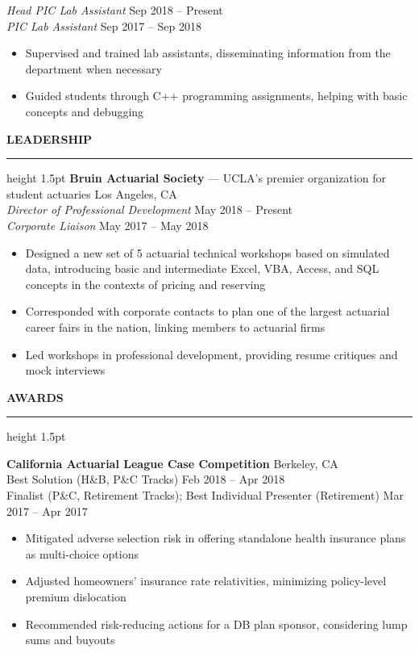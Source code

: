\documentclass[11pt,letterpaper]{article}
\newcommand{\sectline}{\vspace{4pt}\hrule height 1.5pt\vspace{4pt}}
\newcommand{\sectspace}{\vspace{8pt}}
\begin{document}
\textit{Head PIC Lab Assistant} \hfill Sep 2018 -- Present \\
\textit{PIC Lab Assistant} \hfill Sep 2017 -- Sep 2018
\begin{itemize}
	\item Supervised and trained lab assistants, disseminating information from the department when necessary
	\item Guided students through C++ programming assignments, helping with basic concepts and debugging
\end{itemize}
\sectspace


\textbf{LEADERSHIP} \sectline
\textbf{Bruin Actuarial Society} --- UCLA's premier organization for student actuaries \hfill Los Angeles, CA \\
\textit{Director of Professional Development} \hfill May 2018 -- Present \\
\textit{Corporate Liaison} \hfill May 2017 -- May 2018
\begin{itemize}
	\item Designed a new set of 5 actuarial technical workshops based on simulated data, introducing basic and intermediate Excel, VBA, Access, and SQL concepts in the contexts of pricing and reserving
	\item Corresponded with corporate contacts to plan one of the largest actuarial career fairs in the nation, linking members to actuarial firms
	\item Led workshops in professional development, providing resume critiques and mock interviews
\end{itemize}
\sectspace

\textbf{AWARDS} \sectline

\textbf{California Actuarial League Case Competition} \hfill Berkeley, CA \\
Best Solution (H\&B, P\&C Tracks) \hfill Feb 2018 -- Apr 2018 \\
Finalist (P\&C, Retirement Tracks); Best Individual Presenter (Retirement) \hfill Mar 2017 -- Apr 2017 
\begin{itemize}
	\item Mitigated adverse selection risk in offering standalone health insurance plans as multi-choice options
	\item Adjusted homeowners' insurance rate relativities, minimizing policy-level premium dislocation 
	\item Recommended risk-reducing actions for a DB plan sponsor, considering lump sums and buyouts 
\end{itemize}
\end{document}
